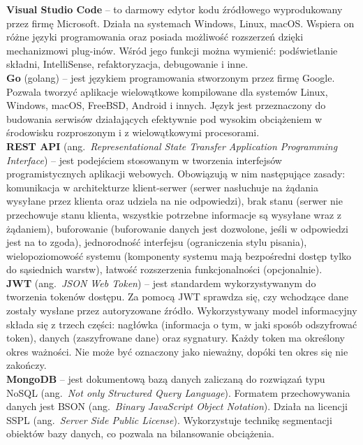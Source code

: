 \noindent\textbf{Visual Studio Code} -- to darmowy edytor kodu źródłowego wyprodukowany przez firmę Microsoft. Działa na systemach Windows, Linux, macOS. Wspiera on różne języki programowania oraz posiada możliwość rozszerzeń dzięki mechanizmowi plug-inów. Wśród jego funkcji można wymienić: podświetlanie składni, IntelliSense, refaktoryzacja, debugowanie i inne.~\cite{vscode} \\

\noindent\textbf{Go} (golang) -- jest językiem programowania stworzonym przez firmę Google. Pozwala tworzyć aplikacje wielowątkowe kompilowane dla systemów Linux, Windows, macOS, FreeBSD, Android i innych. Język jest przeznaczony do budowania serwisów działających efektywnie pod wysokim obciążeniem w środowisku rozproszonym i z wielowątkowymi procesorami.~\cite{golang1,golang2,golang3,godoc} \\

\noindent\textbf{REST API} (ang.~\emph{Representational State Transfer Application Programming Interface}) -- jest podejściem stosowanym w tworzenia interfejsów programistycznych aplikacji webowych. Obowiązują w nim następujące zasady: komunikacja w architekturze klient-serwer (serwer nasłuchuje na żądania wysyłane przez klienta oraz udziela na nie odpowiedzi), brak stanu (serwer nie przechowuje stanu klienta, wszystkie potrzebne informacje są wysyłane wraz z żądaniem), buforowanie (buforowanie danych jest dozwolone, jeśli w odpowiedzi jest na to zgoda), jednorodność interfejsu (ograniczenia stylu pisania), wielopoziomowość systemu (komponenty systemu mają bezpośredni dostęp tylko do sąsiednich warstw), łatwość rozszerzenia funkcjonalności (opcjonalnie).  \cite{rest_api,rest_api_best} \\

\noindent\textbf{JWT} (ang.~\emph{JSON Web Token}) -- jest standardem wykorzystywanym do tworzenia tokenów dostępu. Za pomocą JWT sprawdza się, czy wchodzące dane zostały wysłane przez autoryzowane źródło. Wykorzystywany model informacyjny składa się z trzech części: nagłówka (informacja o tym, w jaki sposób odszyfrować token), danych (zaszyfrowane dane) oraz sygnatury. Każdy token ma określony okres ważności. Nie może być oznaczony jako nieważny, dopóki ten okres się nie zakończy.~\cite{jwt} \\

\noindent\textbf{MongoDB} -- jest dokumentową bazą danych zaliczaną do rozwiązań typu NoSQL (ang.~\emph{Not only Structured Query Language}). Formatem przechowywania danych jest BSON (ang.~\emph{Binary JavaScript Object Notation}). Działa na licencji SSPL (ang.~\emph{Server Side Public License}). Wykorzystuje technikę segmentacji obiektów bazy danych, co pozwala na bilansowanie obciążenia.~\cite{mongoDB,mongoDB_doc,mongodb_habr} \\

